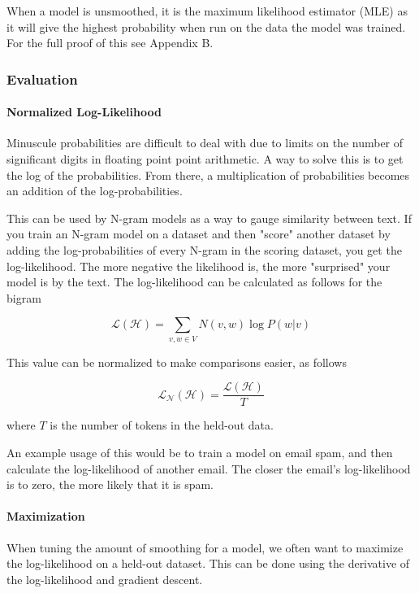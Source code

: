 \documentclass[11pt]{article}
\begin{document}
When a model is unsmoothed, it is the maximum likelihood estimator (MLE) as it will give the highest probability when run on the data the model was trained. For the full proof of this see Appendix B.

\subsubsection{Evaluation}

\paragraph{Normalized Log-Likelihood}

Minuscule probabilities are difficult to deal with due to limits on the number of significant digits in floating point point arithmetic. A way to solve this is to get the log of the probabilities. From there, a multiplication of probabilities becomes an addition of the log-probabilities.

This can be used by N-gram models as a way to gauge similarity between text. If you train an N-gram model on a dataset and then "score" another dataset by adding the log-probabilities of every N-gram in the scoring dataset, you get the log-likelihood. The more negative the likelihood is, the more "surprised" your model is by the text. The log-likelihood can be calculated as follows for the bigram

$$ \mathcal{L}\left(\mathcal{H}\right) = \sum\limits_{v, w \in V} N\left(v, w \right) \log P\left(w \vert v \right) $$

This value can be normalized to make comparisons easier, as follows

$$ \mathcal{L}_\mathcal{N}\left(\mathcal{H}\right) = \frac{ \mathcal{L}\left(\mathcal{H}\right) }{T} $$

where $T$ is the number of tokens in the held-out data.

An example usage of this would be to train a model on email spam, and then calculate the log-likelihood of another email. The closer the email's log-likelihood is to zero, the more likely that it is spam.

\paragraph{Maximization}

When tuning the amount of smoothing for a model, we often want to maximize the log-likelihood on a held-out dataset. This can be done using the derivative of the log-likelihood and gradient descent.
\end{document}

